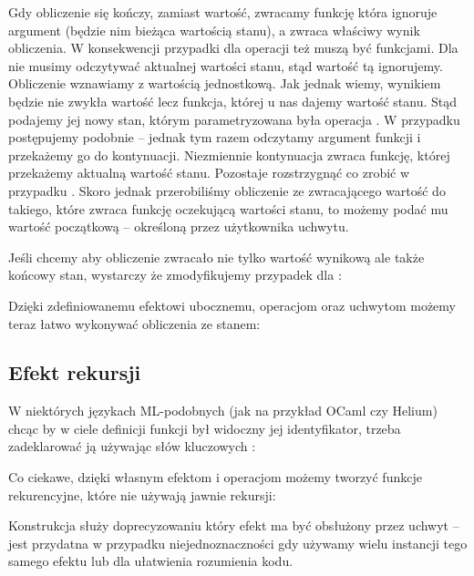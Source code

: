 

Gdy obliczenie się kończy, zamiast wartość, zwracamy funkcję która ignoruje argument (będzie nim bieżąca wartością stanu), a zwraca właściwy wynik obliczenia. W konsekwencji przypadki dla operacji też muszą być funkcjami. Dla  nie musimy odczytywać aktualnej wartości stanu, stąd wartość tą ignorujemy. Obliczenie wznawiamy z wartością jednostkową. Jak jednak wiemy, wynikiem będzie nie zwykła wartość lecz funkcja, której u nas dajemy wartość stanu. Stąd podajemy jej nowy stan, którym parametryzowana była operacja . W przypadku  postępujemy podobnie -- jednak tym razem odczytamy argument funkcji i przekażemy go do kontynuacji. Niezmiennie kontynuacja zwraca funkcję, której przekażemy aktualną wartość stanu. Pozostaje rozstrzygnąć co zrobić w przypadku . Skoro jednak przerobiliśmy obliczenie ze zwracającego wartość do takiego, które zwraca funkcję oczekującą wartości stanu, to możemy podać mu wartość początkową -- określoną przez użytkownika uchwytu.

Jeśli chcemy aby obliczenie zwracało nie tylko wartość wynikową ale także końcowy stan, wystarczy że zmodyfikujemy przypadek dla :



Dzięki zdefiniowanemu efektowi ubocznemu, operacjom oraz uchwytom możemy teraz łatwo wykonywać obliczenia ze stanem:



\subsection{Efekt rekursji}

W niektórych językach ML-podobnych (jak na przykład OCaml czy Helium) chcąc by w ciele definicji funkcji był widoczny jej identyfikator, trzeba zadeklarować ją używając słów kluczowych :



Co ciekawe, dzięki własnym efektom i operacjom możemy tworzyć funkcje rekurencyjne, które nie używają jawnie rekursji:



Konstrukcja  służy doprecyzowaniu który efekt ma być obsłużony przez uchwyt -- jest przydatna w przypadku niejednoznaczności gdy używamy wielu instancji tego samego efektu lub dla ułatwienia rozumienia kodu.

